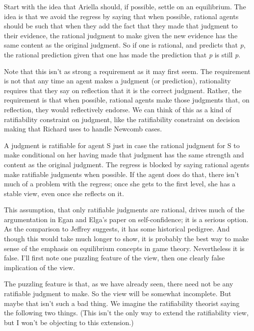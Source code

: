 Start with the idea that \gls{Ariella} should, if possible, settle on an equilibrium. The idea is that we avoid the regress by saying that when possible, rational agents should be such that when they add the fact that they made that judgment to their evidence, the rational judgment to make given the new evidence has the same content as the original judgment. So if one is rational, and predicts that \emph{p}, the rational prediction given that one has made the prediction that \emph{p} is still \emph{p}.

Note that this isn't as strong a requirement as it may first seem. The requirement is not that any time an agent makes a judgment (or prediction), rationality requires that they say on reflection that it is the correct judgment. Rather, the requirement is that when possible, rational agents make those judgments that, on reflection, they would reflectively endorse. We can think of this as a kind of ratifiability constraint on judgment, like the ratifiability constraint on decision making that Richard \citet{Jeffrey1983} uses to handle Newcomb cases.

A judgment is ratifiable for agent S just in case the rational judgment for S to make conditional on her having made that judgment has the same strength and content as the original judgment. The regress is blocked by saying rational agents make ratifiable judgments when possible. If the agent does do that, there isn't much of a problem with the regress; once she gets to the first level, she has a stable view, even once she reflects on it.

This assumption, that only ratifiable judgments are rational, drives much of the argumentation in Egan and Elga's paper on self-confidence; it is a serious option. As the comparison to Jeffrey suggests, it has some historical pedigree. And though this would take much longer to show, it is probably the best way to make sense of the emphasis on equilibrium concepts in game theory. Nevertheless it is false. I'll first note one puzzling feature of the view, then one clearly false implication of the view.

The puzzling feature is that, as we have already seen, there need not be any ratifiable judgment to make. So the view will be somewhat incomplete. But maybe that isn't such a bad thing. We imagine the ratifiability theorist saying the following two things. (This isn't the only way to extend the ratifiability view, but I won't be objecting to this extension.)

